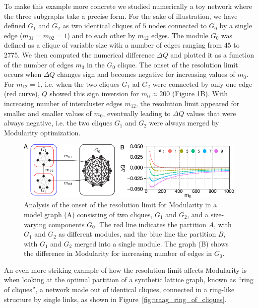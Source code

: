 To make this example more concrete we studied numerically a toy network where the three subgraphs take a precise form.
For the sake of illustration, we have defined $G_1$ and $G_2$ as two identical cliques of $5$ nodes connected to $G_0$ by a single edge ($m_{01}=m_{02}=1$) and to each other by $m_{12}$ edges.
The module $G_0$ was defined as a clique of variable size with a number of edges ranging from 45 to 2775. We then computed the numerical difference $\Delta Q$ and plotted it as a function of the number of edges $m_0$ in the $G_0$ clique. The onset of the resolution limit occurs when $\Delta Q$ changes sign and becomes negative for increasing values of $m_0$.
For $m_{12}=1$, i.e. when the two cliques $G_1$ ad $G_2$ were connected by only one edge (red curve), $Q$ showed this sign inversion for $m_0 \approx 200$ (Figure \ref{fig:figure_1_barthelemy}B).
With increasing number of intercluster edges $m_{12}$, the resolution limit appeared for smaller and smaller values of $m_0$, eventually leading to $\Delta Q$ values that were always negative, i.e. the two cliques $G_1$ and $G_2$ were always merged by Modularity optimization.


\begin{figure}[htb!]
\centering
\includegraphics[width=1\textwidth]{images/barthelemy_modularity.pdf}
\caption{Analysis of the onset of the resolution limit for Modularity in a model graph (A) consisting of two cliques, $G_1$ and $G_2$, and a size-varying components $G_0$. The red line indicates the partition $A$, with $G_1$ and $G_2$ as different modules, and the blue line the partition $B$, with $G_1$ and $G_2$ merged into a single module. The graph (B) shows the difference in Modularity for increasing number of edges in $G_0$.}
\label{fig:figure_1_barthelemy}
\end{figure}

An even more striking example of how the resolution limit affects Modularity is when looking at the optimal partition of a synthetic lattice graph, known as ``ring of cliques'', a network made out of identical cliques, connected in a ring-like structure by single links, as shown in Figure~\ref{fig:traag_ring_of_cliques}. 

